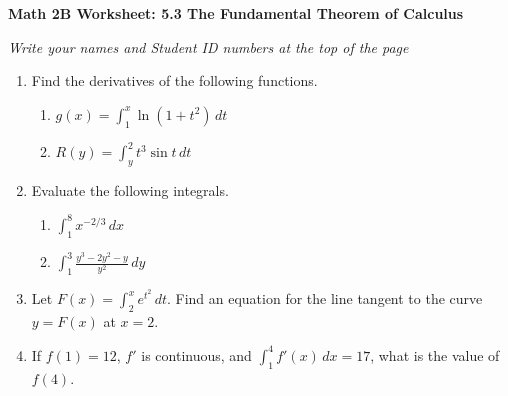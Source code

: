 \documentclass[12pt,fleqn]{article}
\begin{document}
\begin{center}
	\textbf{Math 2B Worksheet: 5.3 The Fundamental Theorem of Calculus}
\end{center}

\emph{Write your names and Student ID numbers at the top of the page}

\begin{enumerate}
\item Find the derivatives of the following functions.
\begin{enumerate}
\item $\displaystyle g(x)=\int_{1}^{x}\ln(1+t^2)\,dt$\\[100pt]


\item $\displaystyle R(y)=\int_{y}^{2}t^3\sin t\,dt$\\[100pt]

\end{enumerate}


\item Evaluate the following integrals.
\begin{enumerate}

\item $\displaystyle \int_{1}^{8}x^{-2/3}\,dx$\\[100pt]


\item $\displaystyle \int_{1}^{3}\frac{y^3-2y^2-y}{y^2}\,dy$
\end{enumerate}

\newpage

\item  Let $F(x)=\int_{2}^{x}e^{t^2}\,dt$.  Find an equation for the line tangent to the curve $y=F(x)$ at $x=2$.

\vfill


\item  If $f(1)=12$, $f'$ is continuous, and $\int_{1}^{4}f'(x)\,dx=17$, what is the value of $f(4)$.

\vfill

\end{enumerate}
\end{document}
